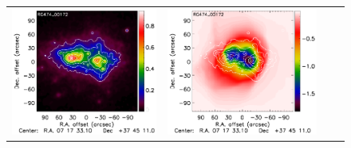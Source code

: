 \documentclass[traditabstract]{aa}
\begin{document}
\begin{figure}[h]
{\begin{tabular}{llll}
\includegraphics[trim=0cm 2.2cm 0cm 0cm, clip=true, scale=1]{Figure/Map_RG474_00172_DMmap_zproj_zobs0p9_raw.pdf} & 
\includegraphics[trim=2.3cm 2.2cm 0cm 0cm, clip=true, scale=1]{Figure/Map_RG474_00172_Ymap_zobs0p9_raw.pdf} & 

\end{tabular}}
\end{figure}
\end{document}
